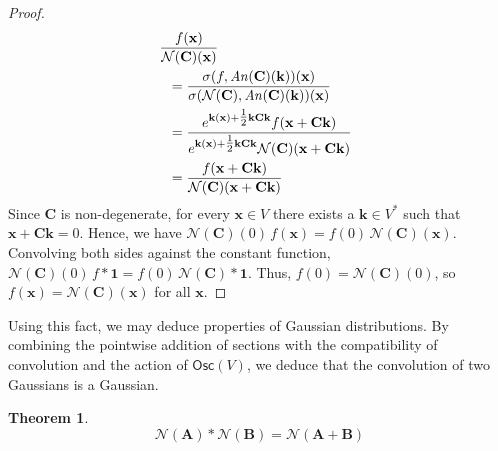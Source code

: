 \documentclass[12pt]{article}
\theoremstyle{definition}
\theoremstyle{plain}
\newtheorem{thm}{Theorem}
\begin{document}
\begin{proof}
\begin{align}
        &\hskip -6pt \frac{f (\mathbf{x})}{\mathcal{N}(\mathbf{C}) (\mathbf{x})} \\
        &= \frac{\sigma(f, \mathit{An}(\mathbf{C})(\mathbf{k})) (\mathbf{x})}{\sigma(\mathcal{N}(\mathbf{C}), \mathit{An}(\mathbf{C})(\mathbf{k})) (\mathbf{x})} \\
        &= \frac{e^{\mathbf{k} (\mathbf{x}) + \tfrac{1}{2} \mathbf{kCk}} f (\mathbf{x} + \mathbf{Ck})}{e^{\mathbf{k} (\mathbf{x}) + \tfrac{1}{2} \mathbf{kCk}} \mathcal{N}(\mathbf{C}) (\mathbf{x}+\mathbf{Ck})} \\
        &= \frac{f (\mathbf{x} + \mathbf{Ck})}{\mathcal{N}(\mathbf{C}) (\mathbf{x} + \mathbf{Ck})}
    \end{align}
    Since \(\mathbf{C}\) is non-degenerate, for every \(\mathbf{x} \in V\) there exists a \(\mathbf{k} \in V^*\) such that \(\mathbf{x} + \mathbf{Ck} = 0\).  Hence, we have \(\mathcal{N}(\mathbf{C})(0) \, f(\mathbf{x}) = f(0) \,\mathcal{N}(\mathbf{C})(\mathbf{x})\).  Convolving both sides against the constant function, \(\mathcal{N}(\mathbf{C})(0) \, f * \boldsymbol{1} = f(0) \, \mathcal{N}(\mathbf{C}) * \boldsymbol{1}\).  Thus, \(f(0) = \mathcal{N}(\mathbf{C})(0)\), so \(f(\mathbf{x}) = \mathcal{N}(\mathbf{C})(\mathbf{x})\) for all \(\mathbf{x}\).
\end{proof}

Using this fact, we may deduce properties of Gaussian distributions.
By combining the pointwise addition of sections with the compatibility of convolution and the action of \(\mathsf{Osc}(V)\), we deduce that the convolution of two Gaussians is a Gaussian.\\

\begin{thm}\label{thm:GaussConv}
  \begin{equation}
    \mathcal{N}(\mathbf{A}) * \mathcal{N}(\mathbf{B}) =
    \mathcal{N}(\mathbf{A} + \mathbf{B})
  \end{equation}
\end{thm}
\end{document}
